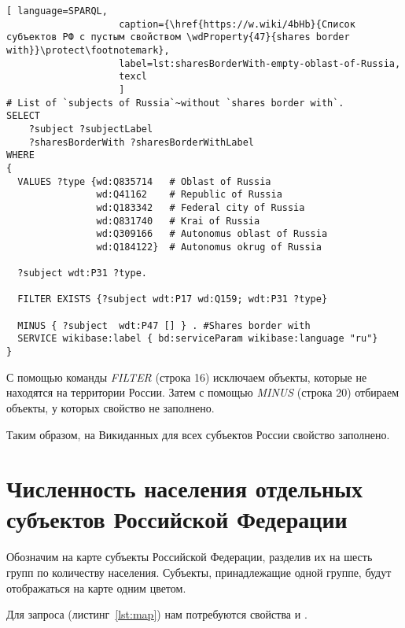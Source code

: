 \lstset{numbers=left, firstnumber=1, frame=single}
\begin{lstlisting}[ language=SPARQL, 
                    caption={\href{https://w.wiki/4bHb}{Список субъектов РФ с пустым свойством \wdProperty{47}{shares border with}}\protect\footnotemark},
                    label=lst:sharesBorderWith-empty-oblast-of-Russia,
                    texcl 
                    ]
# List of `subjects of Russia`~without `shares border with`. 
SELECT 
    ?subject ?subjectLabel 
    ?sharesBorderWith ?sharesBorderWithLabel
WHERE
{
  VALUES ?type {wd:Q835714   # Oblast of Russia
                wd:Q41162    # Republic of Russia
                wd:Q183342   # Federal city of Russia
                wd:Q831740   # Krai of Russia
                wd:Q309166   # Autonomus oblast of Russia
                wd:Q184122}  # Autonomus okrug of Russia
  
  ?subject wdt:P31 ?type.
  
  FILTER EXISTS {?subject wdt:P17 wd:Q159; wdt:P31 ?type}
  
  MINUS { ?subject  wdt:P47 [] } . #Shares border with 
  SERVICE wikibase:label { bd:serviceParam wikibase:language "ru"}
}
\end{lstlisting}%

С помощью команды \textit{FILTER} (строка 16) исключаем объекты, которые не находятся на территории России. Затем с помощью \textit{MINUS} (строка 20) отбираем объекты, у которых свойство  не заполнено.

Таким образом, на Викиданных для всех субъектов России свойство  заполнено.

\section{Численность населения отдельных субъектов Российской Федерации}

Обозначим на карте субъекты Российской Федерации, разделив их на шесть групп по количеству населения. Субъекты, принадлежащие одной группе, будут отображаться на карте одним цветом.

Для запроса (листинг~\ref{lst:map}) нам потребуются свойства  и .

